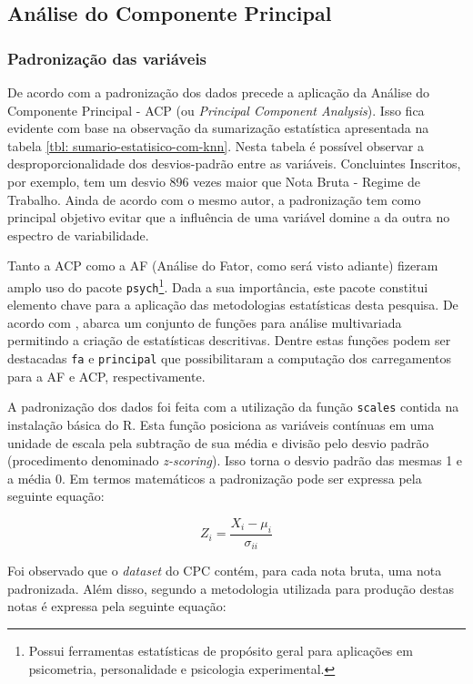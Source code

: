 \subsection{Análise do Componente Principal}
\subsubsection{Padronização das variáveis}

De acordo com  a padronização dos dados precede a aplicação da Análise do Componente Principal - ACP (ou \textit{Principal Component Analysis}). Isso fica evidente com base na observação da sumarização estatística apresentada na tabela \ref{tbl: sumario-estatisico-com-knn}. Nesta tabela é possível observar a desproporcionalidade dos desvios-padrão entre as variáveis. Concluintes Inscritos, por exemplo, tem um desvio 896 vezes maior que Nota Bruta - Regime de Trabalho. Ainda de acordo com o mesmo autor, a padronização tem como principal objetivo evitar que a influência de uma variável domine a da outra no espectro de variabilidade.

Tanto a ACP como a AF (Análise do Fator, como será visto adiante) fizeram amplo uso do pacote \lstinline{psych}\footnote{Possui ferramentas estatísticas de propósito geral para aplicações em psicometria, personalidade e psicologia experimental.}. Dada a sua importância, este pacote constitui elemento chave para a aplicação das metodologias estatísticas desta pesquisa. De acordo com , abarca um conjunto de funções para análise multivariada permitindo a criação de estatísticas descritivas. Dentre estas funções podem ser destacadas \lstinline{fa} e \lstinline{principal} que possibilitaram a computação dos carregamentos para a AF e ACP, respectivamente.

A padronização dos dados foi feita com a utilização da função \lstinline{scales} contida na instalação básica do R. Esta função posiciona as variáveis contínuas em uma unidade de escala pela subtração de sua média e divisão pelo desvio padrão (procedimento denominado \textit{z-scoring}). Isso torna o desvio padrão das mesmas 1 e a média 0. Em termos matemáticos a padronização pode ser expressa pela seguinte equação: 

\begin{equation}
Z_{i}=\dfrac{X_{i}-\mu_{i}}{\sigma_{ii}}
\end{equation}

Foi observado que o \textit{dataset} do CPC contém, para cada nota bruta, uma nota padronizada. Além disso, segundo  a metodologia utilizada para produção destas notas é expressa pela seguinte equação: 

